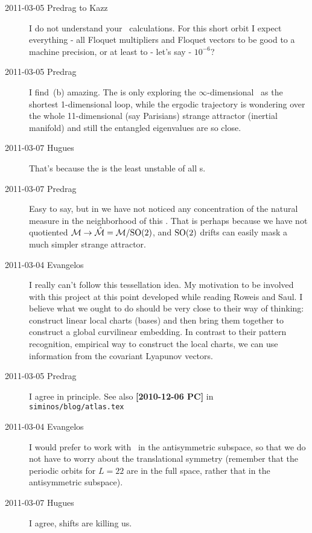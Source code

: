 \begin{description}
\item[2011-03-05 Predrag to Kazz] I do not understand your \po\ calculations.
For this short orbit I expect everything - all Floquet multipliers and
Floquet vectors to be good to a machine precision, or at least to - let's say -
$10^{-6}$?

\item[2011-03-05 Predrag]
I find
\,(b) amazing. The {\po}  is
only exploring the $\infty$-dimensional \statesp\ as the
shortest 1-dimensional loop, while the ergodic trajectory is
wondering over the whole 11-dimensional (say Parisians) strange attractor
(inertial manifold) and still the entangled eigenvalues are so close.

\item[2011-03-07 Hugues]
That's because the {\po}  is the least unstable of all
\po s.

\item[2011-03-07 Predrag] Easy to say, but in  we have
not noticed any concentration of the natural measure in the neighborhood of
this \po. That is perhaps because we have not quotiented
${\cal M} \to \hat{\cal M} = {\cal M}/\textrm{SO}(2)$, and $\textrm{SO}(2)$ drifts can easily
mask a much simpler strange attractor.


\item[2011-03-04 Evangelos]
I really can't follow this tessellation idea. My motivation to be
involved with this project at this point developed while reading Roweis
and Saul. I believe what we ought to do should be very close
to their way of thinking: construct linear local charts (bases) and then
bring them together to construct a global curvilinear embedding. In
contrast to their pattern recognition, empirical way to construct the
local charts, we can use information from the covariant Lyapunov vectors.

\item[2011-03-05 Predrag]
I agree in principle.
See also {\bf [2010-12-06 PC]} in \texttt{siminos/blog/atlas.tex}

\item[2011-03-04 Evangelos]
I would prefer to work with \KS\ in the antisymmetric subspace, so that we do not
have to worry about the translational symmetry (remember that the periodic
orbits for $L=22$ are in the full space, rather that in the antisymmetric
subspace).

\item[2011-03-07 Hugues]
I agree, shifts are killing us.


\end{description}
